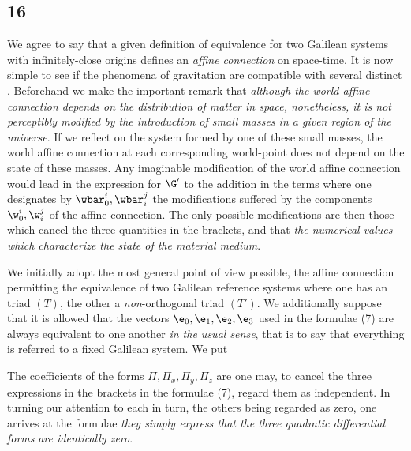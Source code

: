 \subsection*{16}
We agree to say that a given definition of equivalence for two Galilean systems with infinitely-close origins defines an \textit{affine connection} on space-time. It is now simple to see if the phenomena of gravitation are compatible with several distinct . Beforehand we make the important remark that \textit{although the world affine connection depends on the distribution of matter in space, nonetheless, it is not perceptibly modified by the introduction of small masses in a given region of the universe}. If we reflect on the system formed by one of these small masses, the world affine connection at each corresponding world-point does not depend on the state of these masses. Any imaginable modification of the world affine connection would lead in the expression for $\G'$ to the addition in the terms
where one designates by $\wbar^i_0 , \wbar^j_i$ the modifications suffered by the components $\w^i_0,\w^j_i$ of the affine connection. The only possible modifications are then those which cancel the three quantities in the brackets, and that \textit{the numerical values which characterize the state of the material medium}.

We initially adopt the most general point of view possible, the affine connection permitting the equivalence of two Galilean reference systems where one has an  triad $(T)$, the other a \textit{non}-orthogonal triad $(T')$. We additionally suppose that it is allowed that the vectors $\e_0,\e_1,\e_2,\e_3$ used in the formulae (7) are always equivalent to one another \textit{in the usual sense}, that is to say that everything is referred to a fixed Galilean system. We put

The coefficients of the forms $\Pi,\Pi_x,\Pi_y,\Pi_z$ are
one may, to cancel the three expressions in the brackets in the formulae (7), regard them as independent. In turning our attention to each in turn, the others being regarded as zero, one arrives at the formulae
\textit{they simply express that the three quadratic differential forms}
\textit{are identically zero}.

